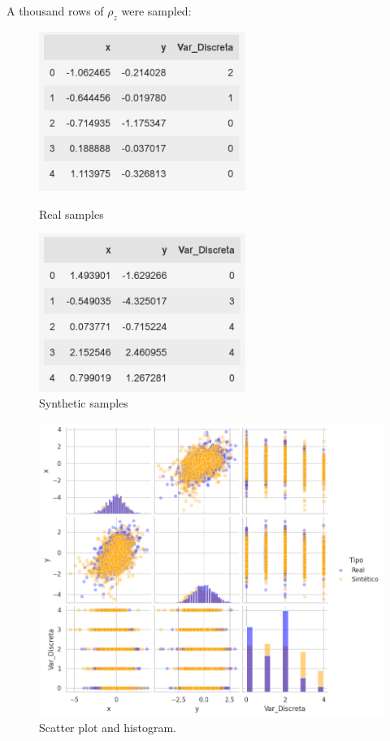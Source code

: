 A thousand rows of $\rho_z$ were sampled:


\begin{figure}[htbp]
    \centering
    \begin{minipage}[b]{0.4\textwidth}
      \centering
      \includegraphics[width=0.6\textwidth]{figures/4-Advanced_Strategies/Ejemplo_Dataset_1_Real.png}
      \caption{Real samples}
    \end{minipage}
    \hfill
    \begin{minipage}[b]{0.4\textwidth}
      \centering
      \includegraphics[width=0.6\textwidth]{figures/4-Advanced_Strategies/Ejemplo_Dataset_1_Sintetico.png}
      \caption{Synthetic samples}
    \end{minipage}
\end{figure}

\begin{figure}[H]
    \centering
    \includegraphics[scale=.35]{figures/4-Advanced_Strategies/pairplot_Dataset1.png}
    \caption{Scatter plot and histogram.}
\end{figure}

